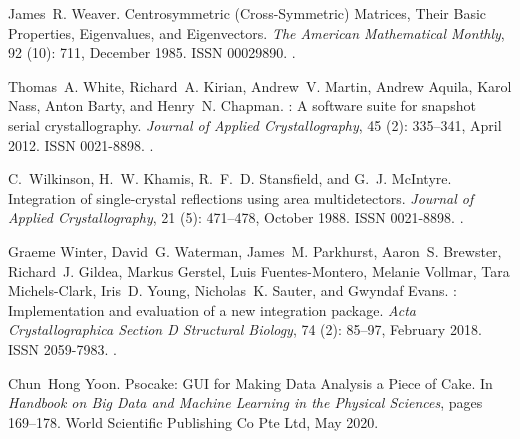 \documentclass[a4paper]{article}
\begin{document}
\begin{thebibliography}{33}
James~R. Weaver.
\newblock Centrosymmetric ({{Cross-Symmetric}}) {{Matrices}}, {{Their Basic
  Properties}}, {{Eigenvalues}}, and {{Eigenvectors}}.
\newblock \emph{The American Mathematical Monthly}, 92 (10):
  711, December 1985.
\newblock ISSN 00029890.
\newblock {}.

Thomas~A. White, Richard~A. Kirian, Andrew~V. Martin, Andrew Aquila, Karol
  Nass, Anton Barty, and Henry~N. Chapman.
 : A software suite for snapshot serial
  crystallography.
\newblock \emph{Journal of Applied Crystallography}, 45 (2):
  335--341, April 2012.
\newblock ISSN 0021-8898.
\newblock {}.

C.~Wilkinson, H.~W. Khamis, R.~F.~D. Stansfield, and G.~J. McIntyre.
\newblock Integration of single-crystal reflections using area multidetectors.
\newblock \emph{Journal of Applied Crystallography}, 21 (5):
  471--478, October 1988.
\newblock ISSN 0021-8898.
\newblock {}.

Graeme Winter, David~G. Waterman, James~M. Parkhurst, Aaron~S. Brewster,
  Richard~J. Gildea, Markus Gerstel, Luis {Fuentes-Montero}, Melanie Vollmar,
  Tara {Michels-Clark}, Iris~D. Young, Nicholas~K. Sauter, and Gwyndaf Evans.
 : Implementation and evaluation of a new
  integration package.
\newblock \emph{Acta Crystallographica Section D Structural Biology},
  74 (2): 85--97, February 2018.
\newblock ISSN 2059-7983.
\newblock {}.

Chun~Hong Yoon.
\newblock Psocake: {{GUI}} for {{Making Data Analysis}} a {{Piece}} of
  {{Cake}}.
\newblock In \emph{Handbook on {{Big Data}} and {{Machine Learning}} in the
  {{Physical Sciences}}}, pages 169--178. {World Scientific Publishing Co Pte
  Ltd}, May 2020.


\end{thebibliography}
\end{document}
